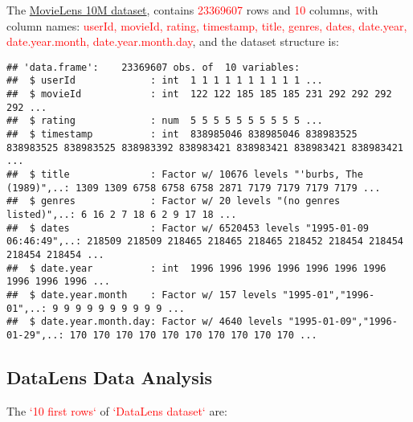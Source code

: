 \documentclass[]{article}
\begin{document}
The \href{https://grouplens.org/datasets/movielens/10m/}{MovieLens 10M
dataset}, contains \textcolor{red}{23369607} rows and
\textcolor{red}{10} columns, with column names:
\textcolor{red}{userId, movieId, rating, timestamp, title, genres, dates, date.year, date.year.month, date.year.month.day},
and the dataset structure is:

\tiny

\begin{verbatim}
## 'data.frame':    23369607 obs. of  10 variables:
##  $ userId             : int  1 1 1 1 1 1 1 1 1 1 ...
##  $ movieId            : int  122 122 185 185 185 231 292 292 292 292 ...
##  $ rating             : num  5 5 5 5 5 5 5 5 5 5 ...
##  $ timestamp          : int  838985046 838985046 838983525 838983525 838983525 838983392 838983421 838983421 838983421 838983421 ...
##  $ title              : Factor w/ 10676 levels "'burbs, The (1989)",..: 1309 1309 6758 6758 6758 2871 7179 7179 7179 7179 ...
##  $ genres             : Factor w/ 20 levels "(no genres listed)",..: 6 16 2 7 18 6 2 9 17 18 ...
##  $ dates              : Factor w/ 6520453 levels "1995-01-09 06:46:49",..: 218509 218509 218465 218465 218465 218452 218454 218454 218454 218454 ...
##  $ date.year          : int  1996 1996 1996 1996 1996 1996 1996 1996 1996 1996 ...
##  $ date.year.month    : Factor w/ 157 levels "1995-01","1996-01",..: 9 9 9 9 9 9 9 9 9 9 ...
##  $ date.year.month.day: Factor w/ 4640 levels "1995-01-09","1996-01-29",..: 170 170 170 170 170 170 170 170 170 170 ...
\end{verbatim}

\normalsize

\hypertarget{datalens-data-analysis}{%
\subsection{DataLens Data Analysis}\label{datalens-data-analysis}}

The \textcolor{red}{`10 first rows`} of
\textcolor{red}{`DataLens dataset`} are:\\
\tiny
\end{document}
